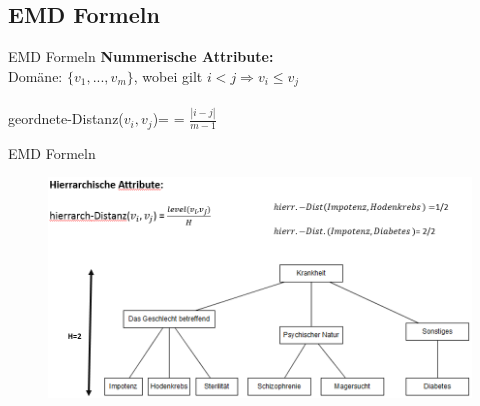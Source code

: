 \subsection{EMD Formeln} 
\begin{frame}{EMD Formeln}
	\textbf{Nummerische Attribute:} \\
	Domäne: $\{v_1,...,v_m\}$, wobei gilt $i<j \Rightarrow v_i \le v_j$\\
	\ \\
	geordnete-Distanz($v_i,v_j$)= = $\frac{|i-j|}{m-1}$
\end{frame}
\begin{frame}{EMD Formeln}
	\begin{figure}
		\includegraphics[scale=0.51]{pic/EMD_Formel.png}
	\end{figure}
\end{frame}
